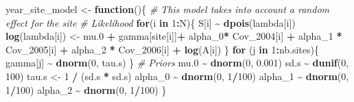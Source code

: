 \documentclass[
]{article}
\newenvironment{Shaded}{\begin{snugshade}}{\end{snugshade}}
\newcommand{\CommentTok}[1]{\textcolor[rgb]{0.56,0.35,0.01}{\textit{#1}}}
\newcommand{\ControlFlowTok}[1]{\textcolor[rgb]{0.13,0.29,0.53}{\textbf{#1}}}
\newcommand{\DecValTok}[1]{\textcolor[rgb]{0.00,0.00,0.81}{#1}}
\newcommand{\FloatTok}[1]{\textcolor[rgb]{0.00,0.00,0.81}{#1}}
\newcommand{\FunctionTok}[1]{\textcolor[rgb]{0.13,0.29,0.53}{\textbf{#1}}}
\newcommand{\NormalTok}[1]{#1}
\newcommand{\OtherTok}[1]{\textcolor[rgb]{0.56,0.35,0.01}{#1}}
\newcommand{\SpecialCharTok}[1]{\textcolor[rgb]{0.81,0.36,0.00}{\textbf{#1}}}
\begin{document}
\begin{Shaded}
\begin{Highlighting}[]
\NormalTok{year\_site\_model }\OtherTok{\textless{}{-}} \ControlFlowTok{function}\NormalTok{()\{}
  \CommentTok{\# This model takes into account a random effect for the site}
  \CommentTok{\# Likelihood}
  \ControlFlowTok{for}\NormalTok{(i }\ControlFlowTok{in} \DecValTok{1}\SpecialCharTok{:}\NormalTok{N)\{}
\NormalTok{    S[i] }\SpecialCharTok{\textasciitilde{}} \FunctionTok{dpois}\NormalTok{(lambda[i])}
    \FunctionTok{log}\NormalTok{(lambda[i]) }\OtherTok{\textless{}{-}}\NormalTok{ mu}\FloatTok{.0} \SpecialCharTok{+}\NormalTok{ gamma[site[i]]}\SpecialCharTok{+}\NormalTok{ alpha\_0}\SpecialCharTok{*}\NormalTok{ Cov\_2004[i] }\SpecialCharTok{+}\NormalTok{ alpha\_1 }\SpecialCharTok{*}\NormalTok{ Cov\_2005[i] }\SpecialCharTok{+}\NormalTok{ alpha\_2 }\SpecialCharTok{*}\NormalTok{ Cov\_2006[i] }\SpecialCharTok{+} \FunctionTok{log}\NormalTok{(A[i])}
\NormalTok{  \}}
  \ControlFlowTok{for}\NormalTok{ (j }\ControlFlowTok{in} \DecValTok{1}\SpecialCharTok{:}\NormalTok{nb.sites)\{}
\NormalTok{    gamma[j] }\SpecialCharTok{\textasciitilde{}} \FunctionTok{dnorm}\NormalTok{(}\DecValTok{0}\NormalTok{, tau.s)}
\NormalTok{  \}}
  \CommentTok{\# Priors}
\NormalTok{  mu}\FloatTok{.0} \SpecialCharTok{\textasciitilde{}} \FunctionTok{dnorm}\NormalTok{(}\DecValTok{0}\NormalTok{, }\FloatTok{0.001}\NormalTok{)}
\NormalTok{  sd.s }\SpecialCharTok{\textasciitilde{}} \FunctionTok{dunif}\NormalTok{(}\DecValTok{0}\NormalTok{, }\DecValTok{100}\NormalTok{)}
\NormalTok{  tau.s }\OtherTok{\textless{}{-}} \DecValTok{1} \SpecialCharTok{/}\NormalTok{ (sd.s }\SpecialCharTok{*}\NormalTok{ sd.s)}
\NormalTok{  alpha\_0 }\SpecialCharTok{\textasciitilde{}} \FunctionTok{dnorm}\NormalTok{(}\DecValTok{0}\NormalTok{, }\DecValTok{1}\SpecialCharTok{/}\DecValTok{100}\NormalTok{)}
\NormalTok{  alpha\_1 }\SpecialCharTok{\textasciitilde{}} \FunctionTok{dnorm}\NormalTok{(}\DecValTok{0}\NormalTok{, }\DecValTok{1}\SpecialCharTok{/}\DecValTok{100}\NormalTok{)}
\NormalTok{  alpha\_2 }\SpecialCharTok{\textasciitilde{}} \FunctionTok{dnorm}\NormalTok{(}\DecValTok{0}\NormalTok{, }\DecValTok{1}\SpecialCharTok{/}\DecValTok{100}\NormalTok{)}
\NormalTok{\} }


\end{Highlighting}
\end{Shaded}
\end{document}
